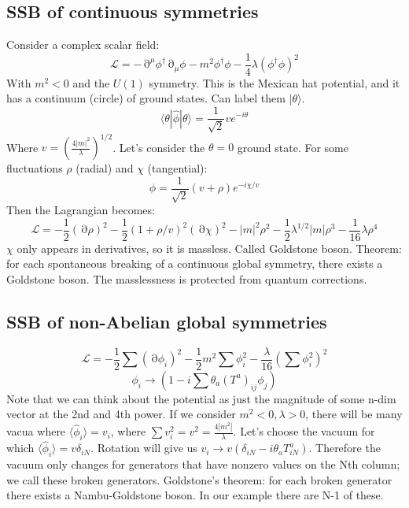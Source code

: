 \documentclass[12 pt]{article}
\DeclareMathOperator {\p} {\partial}
\begin{document}
\subsection*{SSB of continuous symmetries}
Consider a complex scalar field:
\[       \mathcal{L} = - \p^{\mu} \phi^{\dagger} \p_{\mu} \phi - m^2 \phi^{\dagger} \phi - \frac{1}{4} \lambda (\phi^{\dagger} \phi)^2       \]
With $m^2<0$ and the $U(1)$ symmetry. This is the Mexican hat potential, and it has a continuum (circle) of ground states. Can label them $|\theta\rangle$.
\[       \langle \theta|\hat \phi |\theta\rangle = \frac{1}{\sqrt{2}} v e^{-i\theta}     \]
Where $v = \left(  \frac{4|m|^2}{\lambda}  \right)^{1/2}$. Let's consider the $\theta = 0$ ground state. For some fluctuations $\rho$ (radial) and $\chi$ (tangential):
\[         \phi = \frac{1}{\sqrt{2}} (v + \rho) e^{-i\chi /v}    \]
Then the Lagrangian becomes:
\[    \mathcal{L} = - \frac{1}{2} (\p \rho)^2 - \frac{1}{2} (1 + \rho/v)^2 (\p \chi)^2 - |m|^2 \rho^2 - \frac{1}{2} \lambda^{1/2} |m| \rho^3 - \frac{1}{16} \lambda \rho^4  \]
$\chi$ only appears in derivatives, so it is massless. Called Goldstone boson. Theorem: for each spontaneous breaking of a continuous global symmetry, there exists a Goldstone boson. The masslessness is protected from quantum corrections.

\subsection*{SSB of non-Abelian global symmetries}
\[            \mathcal{L} = -\frac{1}{2} \sum (\p \phi_i)^2 - \frac{1}{2} m^2 \sum \phi_i^2 - \frac{\lambda}{16} (\sum \phi_i^2)^2         \]
\[       \phi_i \to (1- i \sum \theta_a (T^a)_{ij}\phi_j )     \]
Note that we can think about the potential as just the magnitude of some n-dim vector at the 2nd and 4th power. If we consider $m^2<0, \lambda>0$, there will be many vacua where $\langle \hat \phi_i \rangle = v_i$, where $\sum v_i^2 = v^2 = \frac{4|m^2|}{\lambda}$. Let's choose the vacuum for which $\langle \hat \phi_i  \rangle = v \delta_{iN}$. Rotation will give us $v_i \to v\left( \delta_{iN} - i \theta_a T^a_{iN}  \right) $. Therefore the vacuum only changes for generators that have nonzero values on the Nth column; we call these broken generators. Goldstone's theorem: for each broken generator there exists a Nambu-Goldstone boson. In our example there are N-1 of these.
\end{document}
